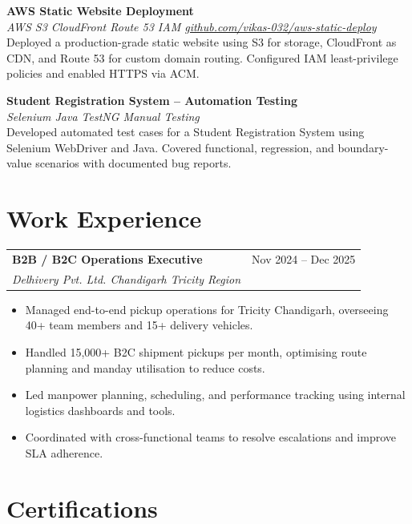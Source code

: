 \documentclass[10pt, a4paper]{article}
\makeatletter
\newcommand{\jobtitle}[4]{%
  \noindent
  \begin{tabularx}{\linewidth}{@{} X r @{}}
    \textbf{\small\color{myBody}#1} & {\footnotesize\color{myMid}#4} \\
    {\footnotesize\color{myAcc}\textit{#2 \textbar{} #3}} & \\
  \end{tabularx}\vspace{1pt}%
}
\newcommand{\projentry}[3]{%
  {\small\bfseries\color{myDark}#1}\\[-3pt]
  {\footnotesize\color{myAcc}\textit{#2}}\\[-1pt]
  {\footnotesize\color{myBody}#3}\par\vspace{2pt}%
}
\makeatother
\begin{document}
\projentry
  {AWS Static Website Deployment}
  {AWS S3 \textbullet{} CloudFront \textbullet{} Route 53 \textbullet{} IAM \textbar{}
   \href{https://github.com/vikas-032/aws-static-deploy}{github.com/vikas-032/aws-static-deploy}}
  {Deployed a production-grade static website using S3 for storage, CloudFront as CDN, and Route 53
   for custom domain routing. Configured IAM least-privilege policies and enabled HTTPS via ACM.}

\projentry
  {Student Registration System -- Automation Testing}
  {Selenium \textbullet{} Java \textbullet{} TestNG \textbullet{} Manual Testing}
  {Developed automated test cases for a Student Registration System using Selenium WebDriver and Java.
   Covered functional, regression, and boundary-value scenarios with documented bug reports.}

\section{Work Experience}

\jobtitle
  {B2B / B2C Operations Executive}
  {Delhivery Pvt. Ltd.}
  {Chandigarh Tricity Region}
  {Nov 2024 -- Dec 2025}

\begin{itemize}
  \item Managed end-to-end pickup operations for Tricity Chandigarh, overseeing 40+ team members and 15+ delivery vehicles.
  \item Handled 15,000+ B2C shipment pickups per month, optimising route planning and manday utilisation to reduce costs.
  \item Led manpower planning, scheduling, and performance tracking using internal logistics dashboards and tools.
  \item Coordinated with cross-functional teams to resolve escalations and improve SLA adherence.
\end{itemize}

\section{Certifications}
\end{document}
